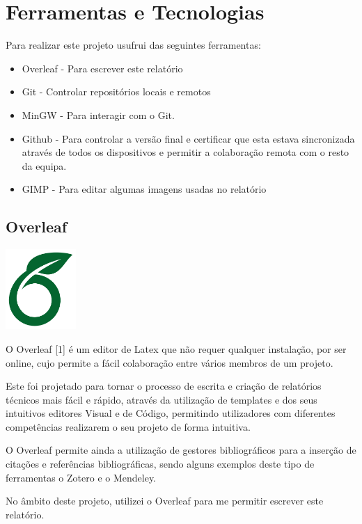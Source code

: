 \documentclass[a4paper,12pt]{article}
\begin{document}
\section{Ferramentas e Tecnologias}
Para realizar este projeto usufrui das seguintes ferramentas:
\begin{itemize}
    \item Overleaf - Para escrever este relatório
    \item Git - Controlar repositórios locais e remotos
    \item MinGW - Para interagir com o Git.
    \item Github - Para  controlar a versão final e certificar que esta estava sincronizada através de todos os dispositivos e permitir a colaboração remota com o resto da equipa.
    \item GIMP - Para editar algumas imagens usadas no relatório
\end{itemize}

\subsection{Overleaf}
    \includegraphics[width=0.2\textwidth]{overleaf.jpg} %
    \vspace{0.5cm}

O Overleaf [1] é um editor de Latex que não requer qualquer instalação, por ser online, cujo permite a fácil colaboração entre vários membros de um projeto.

Este foi projetado para tornar o processo de escrita e criação de relatórios técnicos mais fácil e rápido, através da utilização de templates e dos seus intuitivos editores Visual e de Código, permitindo utilizadores com diferentes competências realizarem o seu projeto de forma intuitiva.

O Overleaf permite ainda a utilização de gestores bibliográficos para a inserção de citações e referências bibliográficas, sendo alguns exemplos deste tipo de ferramentas o Zotero e o Mendeley.

No âmbito deste projeto, utilizei o Overleaf para me permitir escrever este relatório.
\end{document}
